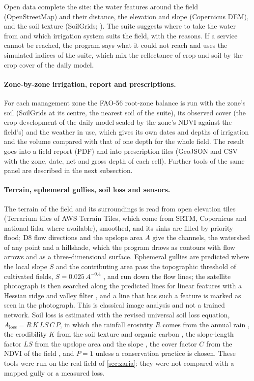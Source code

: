 \documentclass[preprint,12pt]{elsarticle}
\begin{document}
Open data complete the site: the water features around the field (OpenStreetMap) and their distance, the elevation and slope (Copernicus DEM), and the soil texture (SoilGrids; \cite{Poggio2021}). The suite suggests where to take the water from and which irrigation system suits the field, with the reasons. If a service cannot be reached, the program says what it could not reach and uses the simulated indices of the suite, which mix the reflectance of crop and soil by the crop cover of the daily model.

\paragraph{Zone-by-zone irrigation, report and prescriptions.}
For each management zone the FAO-56 root-zone balance \cite{Allen1998} is run with the zone's soil (SoilGrids at its centre, the nearest soil of the suite), its observed cover (the crop development of the daily model scaled by the zone's NDVI against the field's) and the weather in use, which gives its own dates and depths of irrigation and the volume compared with that of one depth for the whole field. The result goes into a field report (PDF) and into prescription files (GeoJSON and CSV with the zone, date, net and gross depth of each cell). Further tools of the same panel are described in the next subsection.

\paragraph{Terrain, ephemeral gullies, soil loss and sensors.}
The terrain of the field and its surroundings is read from open elevation tiles (Terrarium tiles of AWS Terrain Tiles, which come from SRTM, Copernicus and national lidar where available), smoothed, and its sinks are filled by priority flood; D8 flow directions and the upslope area $A$ give the channels, the watershed of any point and a hillshade, which the program draws as contours with flow arrows and as a three-dimensional surface. Ephemeral gullies are predicted where the local slope $S$ and the contributing area pass the topographic threshold of cultivated fields, $S=0.025\,A^{-0.4}$ \cite{Vandaele1996}, and run down the flow lines; the satellite photograph is then searched along the predicted lines for linear features with a Hessian ridge and valley filter \cite{Frangi1998}, and a line that has such a feature is marked as seen in the photograph. This is classical image analysis and not a trained network. Soil loss is estimated with the revised universal soil loss equation, $A_{\mathrm{loss}}=R\,K\,LS\,C\,P$, in which the rainfall erosivity $R$ comes from the annual rain \cite{Renard1994}, the erodibility $K$ from the soil texture and organic carbon \cite{Sharpley1990}, the slope-length factor $LS$ from the upslope area and the slope \cite{Moore1992}, the cover factor $C$ from the NDVI of the field \cite{vanderKnijff1999}, and $P=1$ unless a conservation practice is chosen. These tools were run on the real field of \cref{sec:zaria}; they were not compared with a mapped gully or a measured loss.
\end{document}
